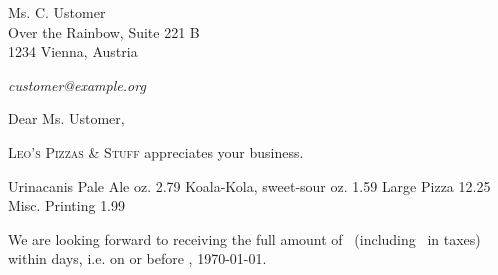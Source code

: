 \documentclass[	backaddress=off,
				paper=letter,
				fontsize=11pt,
				parskip=full]{scrlttr2}
\begin{document}
	\def\payperiod		{14}	%
					\def\invoicenumber	{42}	%
	\begin{letter}{%
%
					Ms. C. Ustomer\\
					Over the Rainbow, Suite 221\kern 1pt B\\
					1234 Vienna, Austria\\				
					\vspace{.25em}\par		%
					 \hfill\emph{customer@example.org}
	}
		\opening{Dear Ms. Ustomer,}

		\textsc{Leo's Pizzas \& Stuff} appreciates your business.%

		\begin{invoice}[N]				%
			\NumbersOff					%
			\SeparatorOff
			\UseDollar

\makeatletter
	\renewcommand*\@amount		{~}					%
	\renewcommand*\@description	{Description}		%
	\renewcommand*\@unitprice	{Unit price}		%
	\renewcommand*\@totalprice	{Total price}		%
	\renewcommand*\@decimalsep	{.}					%

	\renewcommand*\@taxabrv		{Combined Sales Tax}
	\renewcommand*\@sumnet		{Subtotal}	%
	\renewcommand*\@sumtot		{Total}	%
	\renewcommand*\@excl		{}	%

\makeatother
	{Urinacanis Pale Ale		 oz.}	{2.79}
	{Koala-Kola, sweet-sour 	 oz.}	{1.59}
		{Large Pizza}								{12.25}
	{Misc. Printing}							{1.99}

		\end{invoice}


We are looking forward to receiving the full amount of
 \Total\ (including \TaxAmnt\ in taxes) within \numberstringnum{\payperiod}
 days{}, i.e. on or before \DayName{\year}{\month}{\day+\payperiod},
 \AdvanceDate[\payperiod]\today{}. 

		\AdvanceDate[-\payperiod]				%

\closing{}					%

	\end{letter}
\end{document}
